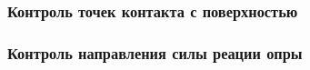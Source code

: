 
\subsubsection{Контроль точек контакта с поверхностью}


\subsubsection{Контроль направления силы реации опры}







% 











